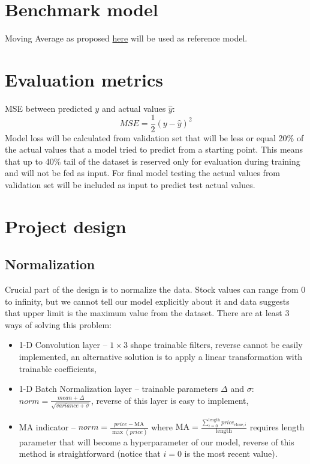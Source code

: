 \documentclass[a4paper,12pt]{article}
\begin{document}
\section{Benchmark model}
Moving Average as proposed \href{https://www.analyticsvidhya.com/blog/2018/10/predicting-stock-price-machine-learningnd-deep-learning-techniques-python/}{here} will be used as reference model.

\section{Evaluation metrics}
MSE between predicted $y$ and actual values $\hat{y}$:
\begin{equation}
	MSE = \frac{1}{2} \left( y - \hat{y} \right)^2
\end{equation}
Model loss will be calculated from validation set that will be less or equal 20\% of the actual values that a model tried to predict from a starting point. This means that up to 40\% tail of the dataset is reserved only for evaluation during training and will not be fed as input. For final model testing the actual values from validation set will be included as input to predict test actual values.

\section{Project design}
\subsection{Normalization}
Crucial part of the design is to normalize the data.
Stock values can range from 0 to infinity, but we cannot tell our model explicitly about it and data suggests that upper limit is the maximum value from the dataset.
There are at least 3 ways of solving this problem:
\begin{itemize}
	\item 1-D Convolution layer -- $1\times3$ shape trainable filters, reverse cannot be easily implemented, an alternative solution is to apply a linear transformation with trainable coefficients,
	\item 1-D Batch Normalization layer -- trainable parameters $\Delta$ and $\sigma$: $norm = \frac{mean + \Delta}{\sqrt{variance + \sigma}}$, reverse of this layer is easy to implement,
	\item MA indicator -- $norm = \frac{price - \text{MA}}{\max (price)}$ where $\text{MA} = \frac{\sum_{i=0}^{\text{length}} price_{\text{close};i}}{\text{length}}$ requires length parameter that will become a hyperparameter of our model, reverse of this method is straightforward (notice that $i=0$ is the most recent value).
\end{itemize}
\end{document}
